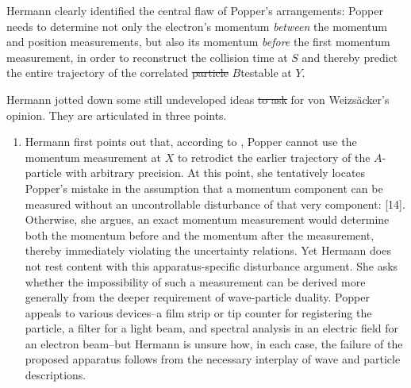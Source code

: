 \documentclass[pdflatex]{sn-jnl}
\newcommand{\vW}{von Weizsäcker\xspace}
\providecommand{\DIFadd}[1]{{\protect\color{blue}\uwave{#1}}} %
\providecommand{\DIFdel}[1]{{\protect\color{red}\sout{#1}}}                      %
\providecommand{\DIFaddbegin}{} %
\providecommand{\DIFaddend}{} %
\providecommand{\DIFdelbegin}{} %
\providecommand{\DIFdelend}{} %
\begin{document}
%
Hermann clearly identified the central flaw of Popper's arrangements: Popper needs to determine not only the electron's momentum \emph{between} the momentum and position measurements, but also its momentum \emph{before} the first momentum measurement, in order to reconstruct the collision time at $S$ and thereby predict the entire trajectory of the correlated \DIFdelbegin \DIFdel{particle }\DIFdelend $B$\DIFaddbegin \DIFadd{-particle, a prediction }\DIFaddend testable at $Y$.

Hermann jotted down some still undeveloped ideas \DIFdelbegin \DIFdel{to ask }\DIFdelend \DIFaddbegin \DIFadd{and asked }\DIFaddend for \vW's opinion. They are articulated in three points.

\begin{enumerate}
\item Hermann first points out that, according to \qm, Popper cannot use the momentum measurement at $X$ to retrodict the earlier trajectory of the $A$-particle with arbitrary precision. At this point, she tentatively locates Popper's mistake in the assumption that a momentum component can be measured without an uncontrollable disturbance of that very component:  [14]. Otherwise, she argues, an exact momentum measurement would determine both the momentum before and the momentum after the measurement, thereby immediately violating the uncertainty relations. Yet Hermann does not rest content with this apparatus-specific disturbance argument. She asks whether the impossibility of such a measurement can be derived more generally from the deeper requirement of wave-particle duality. Popper appeals to various devices--a film strip or tip counter for registering the particle, a filter for a light beam, and spectral analysis in an electric field for an electron beam--but Hermann is unsure how, in each case, the failure of the proposed apparatus follows from the necessary interplay of wave and particle descriptions.


\end{enumerate}
\end{document}
